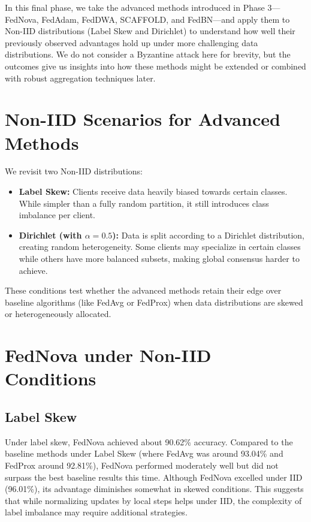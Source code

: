 \documentclass[12pt,a4paper]{report}
\begin{document}
In this final phase, we take the advanced methods introduced in Phase 3—FedNova, FedAdam, FedDWA, SCAFFOLD, and FedBN—and apply them to Non-IID distributions (Label Skew and Dirichlet) to understand how well their previously observed advantages hold up under more challenging data distributions. We do not consider a Byzantine attack here for brevity, but the outcomes give us insights into how these methods might be extended or combined with robust aggregation techniques later.

\section{Non-IID Scenarios for Advanced Methods}

We revisit two Non-IID distributions:
\begin{itemize}
	\item \textbf{Label Skew:} Clients receive data heavily biased towards certain classes. While simpler than a fully random partition, it still introduces class imbalance per client.
	\item \textbf{Dirichlet (with $\alpha=0.5$):} Data is split according to a Dirichlet distribution, creating random heterogeneity. Some clients may specialize in certain classes while others have more balanced subsets, making global consensus harder to achieve.
\end{itemize}

These conditions test whether the advanced methods retain their edge over baseline algorithms (like FedAvg or FedProx) when data distributions are skewed or heterogeneously allocated.

\section{FedNova under Non-IID Conditions}

\subsection{Label Skew}
Under label skew, FedNova achieved about 90.62\% accuracy. Compared to the baseline methods under Label Skew (where FedAvg was around 93.04\% and FedProx around 92.81\%), FedNova performed moderately well but did not surpass the best baseline results this time. Although FedNova excelled under IID (96.01\%), its advantage diminishes somewhat in skewed conditions. This suggests that while normalizing updates by local steps helps under IID, the complexity of label imbalance may require additional strategies.
\end{document}

